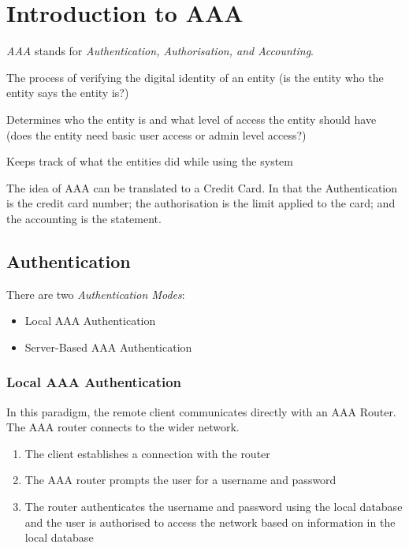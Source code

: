 
\section{Introduction to AAA}
\textit{AAA} stands for \textit{Authentication, Authorisation, and Accounting}. 

\begin{define}
\item[Authentication] The process of verifying the digital identity of an entity (is the entity who the entity says the entity is?)
\item[Authorisation] Determines who the entity is and what level of access the entity should have (does the entity need basic user access or admin level access?)
\item[Accounting] Keeps track of what the entities did while using the system  
\end{define}

The idea of AAA can be translated to a Credit Card. In that the Authentication is the credit card number; the authorisation is the limit applied to the card; and the accounting is the statement.

\subsection{Authentication}
There are two \textit{Authentication Modes}:
\begin{itemize}
    \item Local AAA Authentication
    \item Server-Based AAA Authentication
\end{itemize}

\subsubsection{Local AAA Authentication}
In this paradigm, the remote client communicates directly with an AAA Router. The AAA router connects to the wider network.
\begin{enumerate}
    \item The client establishes a connection with the router
    \item The AAA router prompts the user for a username and password
    \item The router authenticates the username and password using the local database and the user is authorised to access the network based on information in the local database
\end{enumerate}

